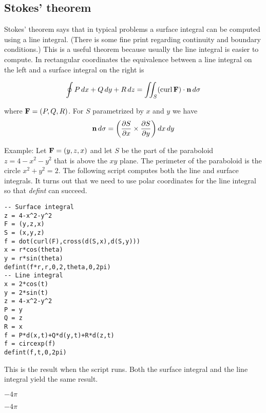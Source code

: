 
\subsection{Stokes' theorem}
Stokes' theorem says that in typical problems a surface integral can be
computed using a line integral.
(There is some fine print regarding continuity and boundary conditions.)
This is a useful theorem because usually the line integral is easier to
compute.
In rectangular coordinates the equivalence between a line integral
on the left and a surface integral on the right is
%

$$\oint P\,dx+Q\,dy+R\,dz
=\int\!\!\!\int_S(\mathop{\rm curl}{\bf F})\cdot{\bf n}\,d\sigma
$$

where ${\bf F}=(P,Q,R)$.
For $S$ parametrized by $x$ and $y$ we have
$${\bf n}\,d\sigma=\left(
{\partial S\over\partial x}\times{\partial S\over\partial y}
\right)dx\,dy$$

Example:
Let ${\bf F}=(y,z,x)$ and let $S$ be the part of the paraboloid
$z=4-x^2-y^2$
that is above the $xy$ plane.
The perimeter of the paraboloid is the circle $x^2+y^2=2$.
The following script computes both the line and surface integrals.
It turns out that we need to use polar coordinates for the
line integral so that {\it defint} can succeed.

\begin{Verbatim}[formatcom=\color{blue},samepage=true]
-- Surface integral
z = 4-x^2-y^2
F = (y,z,x)
S = (x,y,z)
f = dot(curl(F),cross(d(S,x),d(S,y)))
x = r*cos(theta)
y = r*sin(theta)
defint(f*r,r,0,2,theta,0,2pi)
-- Line integral
x = 2*cos(t)
y = 2*sin(t)
z = 4-x^2-y^2
P = y
Q = z
R = x
f = P*d(x,t)+Q*d(y,t)+R*d(z,t)
f = circexp(f)
defint(f,t,0,2pi)
\end{Verbatim}

This is the result when the script runs.
Both the surface integral and the line integral
yield the same result.

$\displaystyle -4\pi$

$\displaystyle -4\pi$
